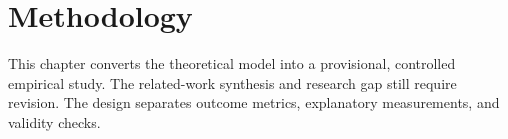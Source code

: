 \chapter{Methodology}
\label{chap:methodology}

This chapter converts the theoretical model into a provisional,
controlled empirical study.  The related-work synthesis and research
gap still require revision.  The design
separates outcome metrics, explanatory measurements, and validity checks.



\cleardoublepage
